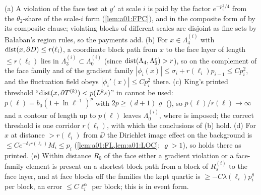 \begin{lemma}\label{lem:a01:F541}
(a) A violation of the face test at $y'$ at scale $i$ is paid by the factor $e^{-p_i^2/4}$ from the $\theta_2$-share of the scale-$i$ form (\cref{lem:a01:FPC}), and in the composite form of \cite[Prop.~3.1]{Ba2} by its composite clause; violating blocks of different scales are disjoint as fine sets by Ba{\l}aban's region rules, so the payments add. (b) For $x\in\Lambda_4^{(i)}$ with $\operatorname{dist}(x,\partial D)\le r(\ell_i)$, a coordinate block path from $x$ to the face layer of length $\le r(\ell_i)$ lies in $\Lambda_3^{(i)}\subset\Lambda_0^{(i)}$ (since $\operatorname{dist}(\Lambda_4,\Lambda_3^c)>r$), so on the complement of the face family and of the gradient family $|\phi_i(x)|\le\sigma_i+r(\ell_i)p_{i-1}\le Cp_i^2$, and the fluctuation field obeys $|\phi_i'(x)|\le Cp_i^2$ there. (c) King's printed threshold ``$\operatorname{dist}(x,\partial T^{(k)})<p(L^k\varepsilon)$'' in \cite[(5.43)--(5.45)]{K2} cannot be used: $p(\ell)=b_0(1+\ln\ell^{-1})^p$ with $2p\ge(d+1)\varrho$ (\cite[(3.54)]{Ba2}), so $p(\ell)/r(\ell)\to\infty$ and a contour of length up to $p(\ell)$ leaves $\Lambda_0^{(i)}$, where \cite[(5.41)]{K2} is imposed; the correct threshold is one corridor $r(\ell_i)$, with which the conclusions of (b) hold. (d) For $x$ at distance $>r(\ell_i)$ from $\DD$ the Dirichlet image effect on the background is $\le Ce^{-\delta_1r(\ell_i)}M_i\le p_i$ (\cref{lem:a01:FL,lem:a01:LOC}; $\varrho>1$), so \cite[(2.113)]{Ba2} holds there as printed. (e) Within distance $R_0$ of the face either a gradient violation or a face-family element is present on a shortest block path from a block of $R_s^{(i)}$ to the face layer, and at face blocks off the families the kept quartic is $\ge-C\lambda(\ell_i)p_i^8$ per block, an error $\le C\ell_i^\alpha$ per block; this is \cite[(5.46)--(5.49)]{K2} in event form.
\end{lemma}
